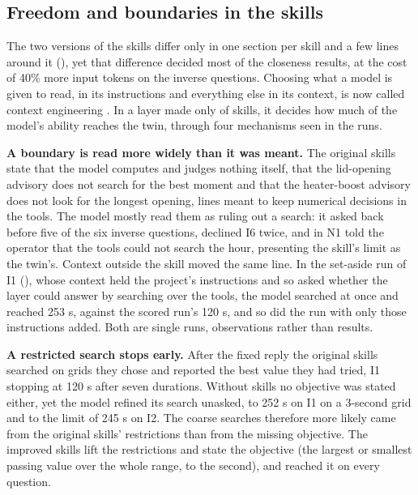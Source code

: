   \subsection{Freedom and boundaries in the skills}
  \label{sec:freedom}

  The two versions of the skills differ only in one section per skill and a few lines around it
  (), yet that difference decided most of the closeness results, at the cost of 40\% more
  input tokens on the inverse questions. Choosing what a model is given to read, in its
  instructions and everything else in its context, is now called context engineering
  \cite{mei2025contextsurvey,anthropic2025contextengineering}. In a layer made only of skills, it
  decides how much of the model's ability reaches the twin, through four mechanisms seen in the
  runs.

  \textbf{A boundary is read more widely than it was meant.} The original skills state that the
  model computes and judges nothing itself, that the lid-opening advisory does not search for the
  best moment and that the heater-boost advisory does not look for the longest opening, lines meant
  to keep numerical decisions in the tools. The model mostly read them as ruling out a search: it
  asked back before five of the six inverse questions, declined I6 twice, and in N1 told the
  operator that the tools could not search the hour, presenting the skill's limit as the twin's.
  Context outside the skill moved the same line. In the set-aside run of I1 (), whose
  context held the project's instructions and so asked whether the layer could answer by searching
  over the tools, the model searched at once and reached 253 s, against the scored run's 120 s,
  and so did the run with only those instructions added. Both are single runs, observations rather than
  results.

  \textbf{A restricted search stops early.} After the fixed reply the original skills searched on
  grids they chose and reported the best value they had tried, I1 stopping at 120 s after seven
  durations. Without skills no objective was stated either, yet the model refined its search
  unasked, to 252 s on I1 on a 3-second grid and to the limit of 245 s on I2. The coarse searches
  therefore more likely came from the original skills' restrictions than from the missing
  objective. The improved skills lift the restrictions and state the objective (the largest or
  smallest passing value over the whole range, to the second), and reached it on every question.


